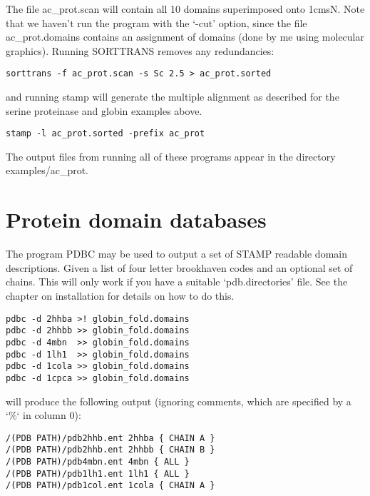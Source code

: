 The file ac\_prot.scan will contain all 10 domains superimposed onto 1cmsN.  Note that
we haven't run the program with the `-cut' option, since the file ac\_prot.domains contains
an assignment of domains (done by me using molecular graphics).  Running
SORTTRANS removes any redundancies:

\begin{scriptsize}\begin{verbatim}
sorttrans -f ac_prot.scan -s Sc 2.5 > ac_prot.sorted
\end{verbatim} \end{scriptsize}

and running stamp will generate the multiple alignment as described for the serine proteinase
and globin examples above.

\begin{scriptsize}\begin{verbatim}
stamp -l ac_prot.sorted -prefix ac_prot
\end{verbatim} \end{scriptsize}

The output files from running all of these programs appear in the directory examples/ac\_prot.

\section{Protein domain databases}

The program PDBC may be used to output a set of STAMP readable
domain descriptions.  Given a list of four letter brookhaven
codes and an optional set of chains.  This will only work if you have
a suitable `pdb.directories' file.  See the chapter on installation for details
on how to do this.

\begin{scriptsize}\begin{verbatim}
pdbc -d 2hhba >! globin_fold.domains
pdbc -d 2hhbb >> globin_fold.domains
pdbc -d 4mbn  >> globin_fold.domains
pdbc -d 1lh1  >> globin_fold.domains
pdbc -d 1cola >> globin_fold.domains
pdbc -d 1cpca >> globin_fold.domains
\end{verbatim} \end{scriptsize}

will produce the following output (ignoring comments, which are specified by a `\%`
in column 0):

\begin{scriptsize}\begin{verbatim}
/(PDB PATH)/pdb2hhb.ent 2hhba { CHAIN A }
/(PDB PATH)/pdb2hhb.ent 2hhbb { CHAIN B }
/(PDB PATH)/pdb4mbn.ent 4mbn { ALL }
/(PDB PATH)/pdb1lh1.ent 1lh1 { ALL }
/(PDB PATH)/pdb1col.ent 1cola { CHAIN A }
\end{verbatim} \end{scriptsize}

